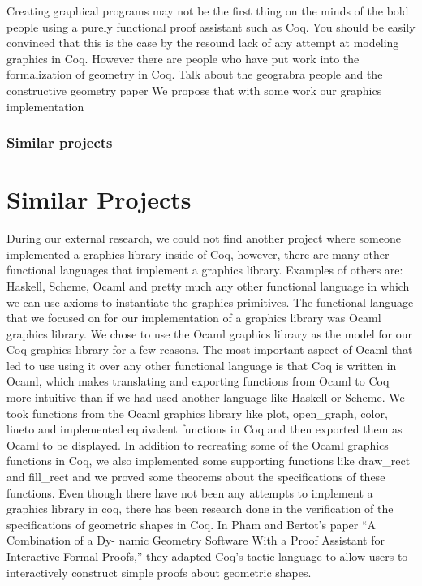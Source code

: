 \documentclass{llncs}
\begin{document}
Creating graphical programs may not be the first thing on the minds of the bold people using a purely functional proof assistant such as Coq.
You should be easily convinced that this is the case by the resound lack of any attempt at modeling graphics in Coq.  However there are people
who have put work into the formalization of geometry in Coq.  {\color{red} Talk about the geograbra people and the constructive geometry paper}
We propose that with some work our graphics implementation 

\subsubsection{Similar projects} 


\section{Similar Projects}
During our external research, we could not find another project where someone
implemented a graphics library inside of Coq, however, there are many other
functional languages that implement a graphics library. Examples of others
are: Haskell, Scheme, Ocaml and pretty much any other functional language in
which we can use axioms to instantiate the graphics primitives. The functional
language that we focused on for our implementation of a graphics library was
Ocaml graphics library. We chose to use the Ocaml graphics library as the
model for our Coq graphics library for a few reasons. The most important
aspect of Ocaml that led to use using it over any other functional language is
that Coq is written in Ocaml, which makes translating and exporting functions
from Ocaml to Coq more intuitive than if we had used another language like
Haskell or Scheme. We took functions from the Ocaml graphics library like plot,
open\_graph, color, lineto and implemented equivalent functions in Coq and
then exported them as Ocaml to be displayed. In addition to recreating some
of the Ocaml graphics functions in Coq, we also implemented some supporting
functions like draw\_rect and fill\_rect and we proved some theorems about the
specifications of these functions.
Even though there have not been any attempts to implement a graphics library
in coq, there has been research done in the verification of the specifications of
geometric shapes in Coq. In Pham and Bertot’s paper “A Combination of a Dy-
namic Geometry Software With a Proof Assistant for Interactive Formal Proofs,”
\cite{geo} they adapted Coq’s tactic language to allow users to interactively
construct simple proofs about geometric shapes.
\end{document}
